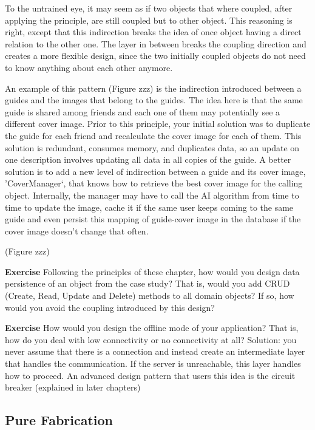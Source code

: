 \documentclass[]{article}
\begin{document}
To the untrained eye, it may seem as if two objects that where coupled,
after applying the principle, are still coupled but to other object.
This reasoning is right, except that this indirection breaks the idea of
once object having a direct relation to the other one. The layer in
between breaks the coupling direction and creates a more flexible
design, since the two initially coupled objects do not need to know
anything about each other anymore.

An example of this pattern (Figure zzz) is the indirection introduced
between a guides and the images that belong to the guides. The idea here
is that the same guide is shared among friends and each one of them may
potentially see a different cover image. Prior to this principle, your
initial solution was to duplicate the guide for each friend and
recalculate the cover image for each of them. This solution is
redundant, consumes memory, and duplicates data, so an update on one
description involves updating all data in all copies of the guide. A
better solution is to add a new level of indirection between a guide and
its cover image, 'CoverManager`, that knows how to retrieve the best
cover image for the calling object. Internally, the manager may have to
call the AI algorithm from time to time to update the image, cache it if
the same user keeps coming to the same guide and even persist this
mapping of guide-cover image in the database if the cover image doesn't
change that often.

(Figure zzz)

\textbf{Exercise} Following the principles of these chapter, how would
you design data persistence of an object from the case study? That is,
would you add CRUD (Create, Read, Update and Delete) methods to all
domain objects? If so, how would you avoid the coupling introduced by
this design?

\textbf{Exercise} How would you design the offline mode of your
application? That is, how do you deal with low connectivity or no
connectivity at all? Solution: you never assume that there is a
connection and instead create an intermediate layer that handles the
communication. If the server is unreachable, this layer handles how to
proceed. An advanced design pattern that users this idea is the circuit
breaker (explained in later chapters)

\subsection{Pure Fabrication}\label{pure-fabrication}
\end{document}
